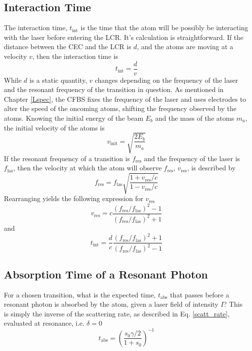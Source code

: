 \subsection{Interaction Time}
The interaction time, $t_{\mathrm{int}}$ is the time that the atom will be possibly be interacting with the laser before entering the LCR. It's calculation is straightforward. If the distance between the CEC and the LCR is $d$, and the atoms are moving at a velocity $v$, then the interaction time is
\begin{equation}
t_{\mathrm{int}} = \frac{d}{v}
\end{equation}
While $d$ is a static quantity, $v$ changes depending on the frequency of the laser and the resonant frequency of the transition in question. As mentioned in Chapter \ref{Lspec}, the CFBS fixes the frequency of the laser and uses electrodes to alter the speed of the oncoming atoms, shifting the frequency observed by the atoms. Knowing the initial energy of the beam $E_b$ and the mass of the atoms $m_a$, the initial velocity of the atoms is 
\begin{equation}
v_{\mathrm{init}}=\sqrt{\frac{2E_b}{m_a}}
\end{equation}
If the resonant frequency of a transition is $f_{\mathrm{res}}$ and the frequency of the laser is $f_{\mathrm{las}}$, then the velocity at which the atom will observe $f_{\mathrm{res}}$, $v_{\mathrm{res}}$, is described by \cite{cmec}
\begin{equation}
f_{\mathrm{res}} = f_{\mathrm{las}} \sqrt{\frac{1+v_{\mathrm{res}}/c}{1-v_{\mathrm{res}}/c}}
\end{equation}
Rearranging yields the following expression for $v_{\mathrm{res}}$
\begin{equation}
v_{\mathrm{res}} = c \frac{(f_{\mathrm{res}}/f_{\mathrm{las}})^2-1}{(f_{\mathrm{res}}/f_{\mathrm{las}})^2+1}
\end{equation}
and
\begin{equation}
t_{\mathrm{int}} = \frac{d}{c} \frac{(f_{\mathrm{res}}/f_{\mathrm{las}})^2+1}{(f_{\mathrm{res}}/f_{\mathrm{las}})^2-1}
\end{equation}

\subsection{Absorption Time of a Resonant Photon}
For a chosen transition, what is the expected time, $t_{\mathrm{abs}}$ that passes before a resonant photon is absorbed by the atom, given a laser field of intensity $I$? This is simply the inverse of the scattering rate, as described in Eq. \ref{scatt_rate}, evaluated at resonance, i.e. $\delta = 0$
\begin{equation}
t_{\mathrm{abs}} = \left(\frac{s_0\gamma/2}{1+s_0}\right)^{-1}
\end{equation}

